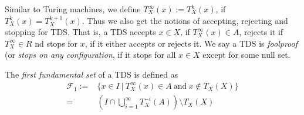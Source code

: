 Similar to Turing machines, we define $T_X^\infty(x):=T_X^k(x)$, if $T_X^k(x)=T_X^{k+1}(x)$. Thus we also get the notions of accepting, rejecting and stopping for TDS.
That is, a TDS accepts $x \in X$, if $T_X^\infty(x) \in A$,
rejects it if $T_X^\infty \in R$ 
nd stops for $x$, if it either accepts or rejects it.
We say a TDS is \emph{foolproof} (or \emph{stops on any configuration}, if it stops for all $x \in X$ except for some null set.

The \emph{first fundamental set} of a TDS is defined as
\begin{align*}
	\mathcal{F}_1 :=&\{ x \in I~|~T_X^\infty(x) \in A~\text{and}~x \notin T_X(X) \} \\
	=&(I \cap \bigcup_{i=1}^\infty T_X^{-i}(A)) \setminus T_X(X)
\end{align*}


